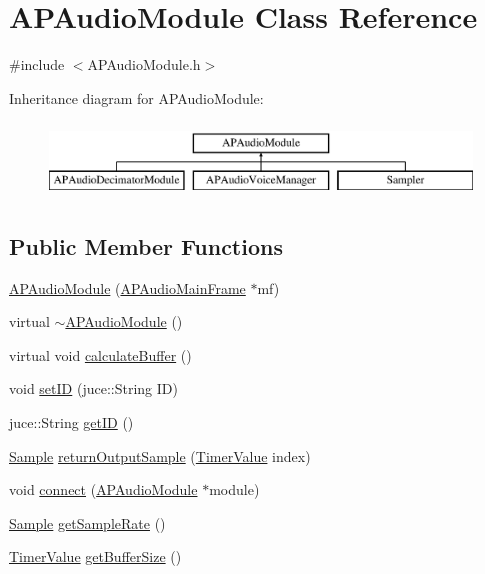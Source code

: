 \hypertarget{class_a_p_audio_module}{\section{A\+P\+Audio\+Module Class Reference}
\label{class_a_p_audio_module}
}


{\ttfamily \#include $<$A\+P\+Audio\+Module.\+h$>$}

Inheritance diagram for A\+P\+Audio\+Module\+:\begin{figure}[H]
\begin{center}
\leavevmode
\includegraphics[height=2.000000cm]{class_a_p_audio_module}
\end{center}
\end{figure}
\subsection*{Public Member Functions}
\begin{DoxyCompactItemize}
\item 
\hyperlink{class_a_p_audio_module_ae539348edfb31d1ecaa0e1feb771f901}{A\+P\+Audio\+Module} (\hyperlink{class_a_p_audio_main_frame}{A\+P\+Audio\+Main\+Frame} $\ast$mf)
\item 
virtual \hyperlink{class_a_p_audio_module_af9f5e6f6ff795a4f8218addb0d17aa94}{$\sim$\+A\+P\+Audio\+Module} ()
\item 
virtual void \hyperlink{class_a_p_audio_module_a10c6d7f469b9d1626a80c4d745663a2a}{calculate\+Buffer} ()
\item 
void \hyperlink{class_a_p_audio_module_a2d53c525276aa2876b188b10eb42795f}{set\+I\+D} (juce\+::\+String I\+D)
\item 
juce\+::\+String \hyperlink{class_a_p_audio_module_a8fc7b1e3961d42e8b42a6025ad2181a0}{get\+I\+D} ()
\item 
\hyperlink{_a_p_audio_module_8h_a4ee69c206c9c7015dc653f7e716c4fe8}{Sample} \hyperlink{class_a_p_audio_module_ac4818c202ad9a769773fdad806187cd2}{return\+Output\+Sample} (\hyperlink{_a_p_audio_module_8h_a7d836cc51adbed3f66d5c4c91ed72e94}{Timer\+Value} index)
\item 
void \hyperlink{class_a_p_audio_module_a746277d94090c0d90d5993a3a9a4a533}{connect} (\hyperlink{class_a_p_audio_module}{A\+P\+Audio\+Module} $\ast$module)
\item 
\hyperlink{_a_p_audio_module_8h_a4ee69c206c9c7015dc653f7e716c4fe8}{Sample} \hyperlink{class_a_p_audio_module_af7d8f2e41de7b9cae9a74bba8ebb1fb0}{get\+Sample\+Rate} ()
\item 
\hyperlink{_a_p_audio_module_8h_a7d836cc51adbed3f66d5c4c91ed72e94}{Timer\+Value} \hyperlink{class_a_p_audio_module_a20c96272ef41b2f5b6cc026e58d0b655}{get\+Buffer\+Size} ()
\end{DoxyCompactItemize}

